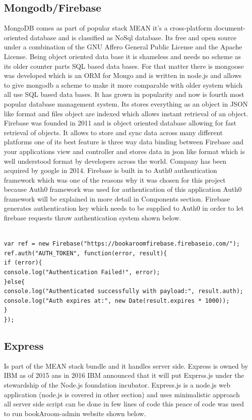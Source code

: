 \begin{itemize}
\subsection{Mongodb/Firebase}
\bigbreak
MongoDB comes as part of popular stack MEAN it’s a cross-platform document-oriented database and is classified as NoSql database. Its free and open source under a combination of the GNU Affero General Public License and the Apache License. Being object oriented data base it is shameless and needs no scheme as its older counter parts SQL based data bases. For that matter there is mongoose was developed which is an ORM for Mongo and is written in node.js and allows to give mongodb a scheme to make it more comparable with older system which all use SQL based data bases. It has grown in popularity and now is fourth most popular database management system. Its stores everything as an object in JSON like format and files object are indexed which allows instant retrieval of an object. 
\\
\bigbreak
Firebase was founded in 2011 and is object oriented database allowing for fast retrieval of objects. It allows to store and sync data across many different platforms one of its best feature is three way data binding between Firebase and your applications view and controller and stores data in json like format which is well understood format by developers across the world. Company has been acquired by google in 2014. Firebase is built in to Auth0 authentication framework which was one of the reasons why it was chosen for this project because Auth0 framework was used for authentication of this application Auth0 framework will be explained in more detail in Components section. Firebase generates authentication key which needs to be supplied to Auth0 in order to let firebase requests throw authentication system shown below.
\begin{verbatim}

var ref = new Firebase("https://bookaroomfirebase.firebaseio.com/");
ref.auth("AUTH_TOKEN", function(error, result){
if (error){
console.log("Authentication Failed!", error);
}else{
console.log("Authenticated successfully with payload:", result.auth);
console.log("Auth expires at:", new Date(result.expires * 1000));
}
});

\end{verbatim}


\subsection{Express}
\bigbreak
Is part of the MEAN stack bundle and it handles server side. Express is owned by IBM as of 2015 ans in 2016 IBM announced that it will put Exprrss.js under the stewardship of the Node.js foundation incubator.
\bigbreak
Express.js is a node.js web application (node.js is covered in other section) and uses minimalistic approach all server side script can be done in few lines of code this peace of code was used to run bookAroom-admin website shown below.


\end{itemize}
